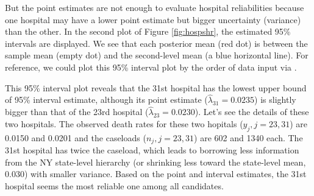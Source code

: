 \documentclass[article]{jss}
\begin{document}
But the point estimates are not enough to evaluate hospital reliabilities because one hospital may have a lower point estimate but  bigger uncertainty (variance) than the other. In the second plot of Figure \ref{fig:hospshr}, the estimated 95\% intervals are displayed. We see that each posterior mean (red dot) is between the sample mean (empty dot) and the second-level mean (a blue horizontal line). For reference, we could plot this 95\% interval plot by the order of data input via .

This 95\% interval plot reveals that the 31st hospital has the lowest upper bound of 95\% interval estimate, although its point estimate ($\hat{\lambda}_{31}=0.0235$) is slightly bigger than that of the 23rd hospital ($\hat{\lambda}_{23}=0.0230$). Let's see the details of these two hospitals. The observed death rates for these two hopitals ($y_{j}, j=23, 31$) are 0.0150 and 0.0201 and the caseloads ($n_{j}, j =23, 31$) are 602 and 1340 each. The 31st hospital has twice the caseload, which leads to borrowing less information from the NY state-level hierarchy (or shrinking less toward the state-level mean, 0.030) with smaller variance. Based on the point and interval estimates, the 31st hospital seems the most reliable one among all candidates. 






\end{document}

